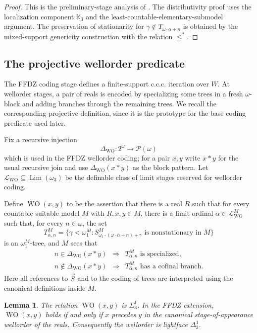 \documentclass[11pt]{article}
\theoremstyle{plain}
\newtheorem{lemma}[theorem]{Lemma}
\theoremstyle{definition}
\theoremstyle{remark}
\newcommand{\Kk}{\mathbb K}
\newcommand{\Lim}{\operatorname{Lim}}
\newcommand{\WO}{\operatorname{WO}}
\newcommand{\Wground}{W}
\begin{document}
\begin{proof}
This is the preliminary-stage analysis of \cite[Propositions 2.2, 2.3 and
2.6]{FISCHER2013763}.  The distributivity proof uses the localization component
$\Kk_3$ and the least-countable-elementary-submodel argument.  The preservation
of stationarity for $\gamma\notin T_{\omega\cdot\alpha+n}$ is obtained by the
mixed-support genericity construction with the relation $\leq^*$.
\end{proof}

\subsection{The projective wellorder predicate}\label{subsec:wo-predicate}

The FFDZ coding stage defines a finite-support c.c.c. iteration over $\Wground$.
At wellorder stages, a pair of reals is encoded by specializing some trees in a
fresh $\omega$-block and adding branches through the remaining trees.  We recall
the corresponding projective definition, since it is the prototype for the base
coding predicate used later.

Fix a recursive injection
\[
\Delta_{\mathrm{WO}}:2^\omega\longrightarrow\mathcal P(\omega)
\]
which is used in the FFDZ wellorder coding; for a pair $x,y$ write $x*y$ for the
usual recursive join and use $\Delta_{\mathrm{WO}}(x*y)$ as the block pattern.
Let $\mathcal L_{\mathrm{WO}}\subseteq\Lim(\omega_3)$ be the definable class of
limit stages reserved for wellorder coding.

Define $\WO(x,y)$ to be the assertion that there is a real $R$ such that for
every countable suitable model $M$ with $R,x,y\in M$, there is a limit ordinal
$\bar\alpha\in\mathcal L_{\mathrm{WO}}^M$ such that, for every $n\in\omega$, the
set
\[
T^M_{\bar\alpha,n}=\{\gamma<\omega_1^M:
S^M_{\omega_1\cdot(\omega\cdot\bar\alpha+n)+\gamma}
\text{ is nonstationary in }M\}
\]
is an $\omega_1^M$-tree, and $M$ sees that
\[
\begin{array}{rcl}
n\in\Delta_{\mathrm{WO}}(x*y)&\Longrightarrow& T^M_{\bar\alpha,n}\text{ is specialized},\\
n\notin\Delta_{\mathrm{WO}}(x*y)&\Longrightarrow& T^M_{\bar\alpha,n}\text{ has a cofinal branch}.
\end{array}
\]
Here all references to $\vec S$ and to the coding of trees are interpreted using
the canonical definitions inside $M$.

\begin{lemma}\label{lem:wo-sigma13}
The relation $\WO(x,y)$ is $\Sigma^1_3$.  In the FFDZ extension, $\WO(x,y)$ holds
if and only if $x$ precedes $y$ in the canonical stage-of-appearance wellorder of
the reals.  Consequently the wellorder is lightface $\Delta^1_3$.
\end{lemma}
\end{document}
